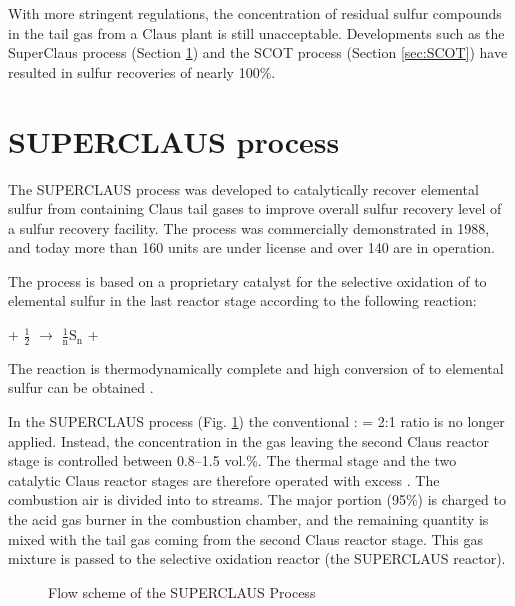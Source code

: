 %

With more stringent regulations, the concentration of residual sulfur compounds in the tail gas from a Claus plant is still unacceptable. Developments such as the SuperClaus process (Section \ref{sec:superclaus})  and the SCOT process (Section \ref{sec:SCOT}) have resulted in sulfur recoveries of nearly 100\%.

\section{SUPERCLAUS process} \label{sec:superclaus}

The SUPERCLAUS process was developed to catalytically recover elemental sulfur from  containing Claus tail gases to improve overall sulfur recovery level of a sulfur recovery facility. The process was commercially demonstrated in 1988, and today more than 160 units are under license and over 140 are in operation.

The process is based on a proprietary catalyst for the selective oxidation of  to elemental sulfur in the last reactor stage according to the following reaction:
\begin{center}
 + $\frac{\text{1}}{\text{2}}$ $\longrightarrow$ $\frac{\text{1}}{\text{n}}\text{S}_{\text{n}}$ + 
\end{center}
The reaction is thermodynamically complete and high conversion of  to elemental sulfur can be obtained \citep{VANNISSELROOYA1993263}.

In the SUPERCLAUS process (Fig. \ref{fig:superclaus}) the conventional : = 2:1 ratio is no longer applied. Instead, the  concentration in the gas leaving the second Claus reactor stage is controlled between 0.8--1.5 vol.\%. The thermal stage and the two catalytic Claus reactor stages are therefore operated with excess . The combustion air is divided into to streams. The major portion (95\%) is charged to the acid gas burner in the combustion chamber, and the remaining quantity is mixed with the tail gas coming from the second Claus reactor stage. This gas mixture is passed to the selective oxidation reactor (the SUPERCLAUS reactor).

\begin{figure}[htbp]
\centering
{}
\caption{Flow scheme of the SUPERCLAUS Process \citep{moulijn2001chemical}} 
\label{fig:superclaus}
\end{figure}

